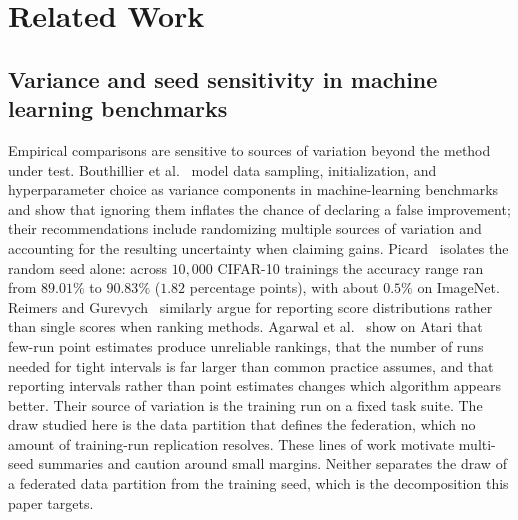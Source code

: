 \section{Related Work}
\label{sec:related}

\subsection{Variance and seed sensitivity in machine learning benchmarks}
Empirical comparisons are sensitive to sources of variation beyond the method under test. Bouthillier et al.~\cite{bouthillier2021accounting} model data sampling, initialization, and hyperparameter choice as variance components in machine-learning benchmarks and show that ignoring them inflates the chance of declaring a false improvement; their recommendations include randomizing multiple sources of variation and accounting for the resulting uncertainty when claiming gains.
Picard~\cite{picard2021seed} isolates the random seed alone: across $10{,}000$ CIFAR-10 trainings the accuracy range ran from $89.01\%$ to $90.83\%$ ($1.82$ percentage points), with about $0.5\%$ on ImageNet. Reimers and Gurevych~\cite{reimers2017scoring} similarly argue for reporting score distributions rather than single scores when ranking methods. Agarwal et al.~\cite{agarwal2021precipice} show on Atari that few-run point estimates produce unreliable rankings, that the number of runs needed for tight intervals is far larger than common practice assumes, and that reporting intervals rather than point estimates changes which algorithm appears better. Their source of variation is the training run on a fixed task suite. The draw studied here is the data partition that defines the federation, which no amount of training-run replication resolves. These lines of work motivate multi-seed summaries and caution around small margins. Neither separates the draw of a federated data partition from the training seed, which is the decomposition this paper targets.

